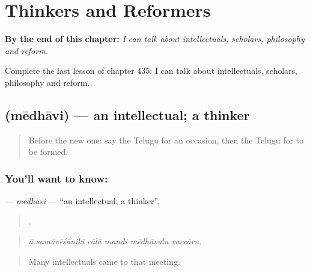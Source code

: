 
\chapter{Thinkers and Reformers}
\label{ch:te-thinkers-and-reformers}

\begin{chapteropening}
\textbf{By the end of this chapter:} \emph{I can talk about intellectuals, scholars, philosophy and reform.}

Complete the last lesson of chapter 435: I can talk about intellectuals, scholars, philosophy and reform.
\end{chapteropening}

\section[\texorpdfstring{\te{మేధావి} (mēdhāvi)}{మేధావి (mēdhāvi)}]{ (mēdhāvi) — an intellectual; a thinker}

\label{lesson:TE-C435-medhavi}



\begin{quote}
Before the new one: say the Telugu for an occasion, then the Telugu for to be formed.
\end{quote}

\subsection*{You'll want to know: }
\textbf{} — \emph{mēdhāvi} — \textquotedblleft{}an intellectual; a thinker\textquotedblright{}.

\begin{quote}
     .
\end{quote}

\begin{quote}
\emph{ā samāvēśāniki cālā mandi mēdhāvulu vaccāru.}
\end{quote}

\begin{quote}
Many intellectuals came to that meeting.
\end{quote}

